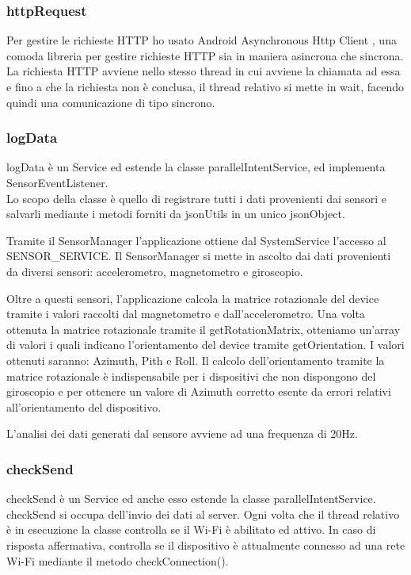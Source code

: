 \documentclass[12pt,a4paper,openright,twoside]{report}
\begin{document}
\subsubsection*{httpRequest}
Per gestire le richieste HTTP ho usato Android Asynchronous Http Client \cite{K19}, una comoda libreria per gestire richieste HTTP sia in maniera asincrona che sincrona.
La richiesta HTTP avviene nello stesso thread in cui avviene la chiamata ad essa e fino a che la richiesta non è conclusa, il thread relativo si mette in wait, facendo quindi una comunicazione di tipo sincrono.

\subsubsection*{logData}
logData è un Service ed estende la classe parallelIntentService, ed implementa SensorEventListener.\\
Lo scopo della classe è quello di registrare tutti i dati provenienti dai sensori e salvarli mediante i metodi forniti da jsonUtils in un unico jsonObject.

Tramite il SensorManager l'applicazione ottiene dal SystemService l'accesso al SENSOR\_SERVICE. Il SensorManager si mette in ascolto dai dati provenienti da diversi sensori: accelerometro, magnetometro e giroscopio.

Oltre a questi sensori, l'applicazione calcola la matrice rotazionale del device tramite i valori raccolti dal magnetometro e dall'accelerometro. Una volta ottenuta la matrice rotazionale tramite il getRotationMatrix, otteniamo un'array di valori i quali indicano l'orientamento del device tramite getOrientation.
I valori ottenuti saranno: Azimuth, Pith e Roll.
Il calcolo dell'orientamento tramite la matrice rotazionale è indispensabile per i dispositivi che non dispongono del giroscopio e per ottenere un valore di Azimuth corretto esente da errori relativi all'orientamento del dispositivo.

L'analisi dei dati generati dal sensore avviene ad una frequenza di 20Hz.


\subsubsection*{checkSend}
checkSend è un Service ed anche esso estende la classe parallelIntentService.
checkSend si occupa dell'invio dei dati al server. Ogni volta che il thread relativo è in esecuzione la classe controlla se il Wi-Fi è abilitato ed attivo. In caso di risposta affermativa, controlla se il dispositivo è attualmente connesso ad una rete Wi-Fi mediante il metodo checkConnection().
\end{document}
